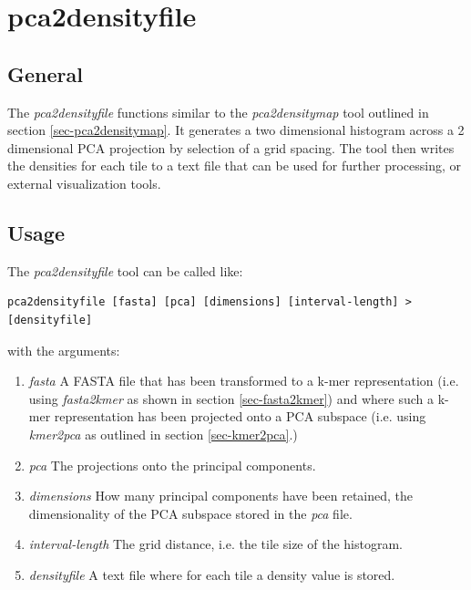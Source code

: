 \section{pca2densityfile} \label{sec-pca2densityfile}

\subsection{General}

The \emph{pca2densityfile} functions similar to the
\emph{pca2densitymap} tool outlined in section
\ref{sec-pca2densitymap}. It generates a two dimensional histogram
across a 2 dimensional PCA projection by selection of a grid
spacing. The tool then writes the densities for each tile to a text
file that can be used for further processing, or external
visualization tools.

\subsection{Usage}

The \emph{pca2densityfile} tool can be called like:
\begin{lstlisting}
pca2densityfile [fasta] [pca] [dimensions] [interval-length] > [densityfile]
\end{lstlisting}
with the arguments:
\begin{enumerate}
  \item \emph{fasta} A FASTA file that has been transformed to a k-mer
    representation (i.e. using \emph{fasta2kmer} as shown in section
    \ref{sec-fasta2kmer}) and where such a k-mer representation has been
    projected onto a PCA subspace (i.e. using \emph{kmer2pca} as
    outlined in section \ref{sec-kmer2pca}.)
  \item \emph{pca} The projections onto the principal components.
  \item \emph{dimensions} How many principal components have been
    retained, the dimensionality of the PCA subspace stored in the
    \emph{pca} file.
  \item \emph{interval-length} The grid distance, i.e. the tile size
    of the histogram.
  \item \emph{densityfile} A text file where for each tile a density
    value is stored.
\end{enumerate}

